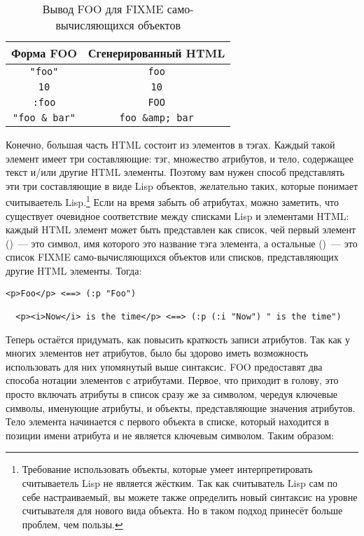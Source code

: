 \begin{table}[tb]
\begin{tabular}{|c|c|}
\hline
  Форма FOO & Сгенерированный HTML \\
\hline
  \lstinline!"foo"! &\lstinline!foo! \\
  \lstinline!10! & \lstinline!10! \\
  \lstinline!:foo! & \lstinline!FOO! \\
  \lstinline!"foo & bar"! & \lstinline!foo &amp; bar!\\
\hline
\end{tabular}
  \caption{Вывод FOO для FIXME само-вычисляющихся объектов} 
  \label{table:30-1}
\end{table}

Конечно, большая часть HTML состоит из элементов в тэгах. Каждый такой элемент имеет три
составляющие: тэг, множество атрибутов, и тело, содержащее текст и/или другие HTML
элементы. Поэтому вам нужен способ представлять эти три составляющие в виде Lisp объектов,
желательно таких, которые понимает считываетель Lisp.\footnote{Требование использовать
  объекты, которые умеет интерпретировать считываетель Lisp не является жёстким. Так как
  считыватель Lisp сам по себе настраиваемый, вы можете также определить новый синтаксис
  на уровне считывателя для нового вида объекта. Но в таком подход принесёт больше
  проблем, чем пользы.} Если на время забыть об атрибутах, можно заметить, что существует
очевидное соответствие между списками Lisp и элементами HTML: каждый HTML элемент может
быть представлен как список, чей первый элемент ()~--- это символ, имя которого
это название тэга элемента, а остальные ()~--- это список FIXME
само-вычисляющихся объектов или списков, представляющих другие HTML элементы. Тогда:

\begin{lstlisting}[style=lisprepl]
  <p>Foo</p> <==> (:p "Foo")

  <p><i>Now</i> is the time</p> <==> (:p (:i "Now") " is the time")
\end{lstlisting}

Теперь остаётся придумать, как повысить краткость записи атрибутов. Так как у многих
элементов нет атрибутов, было бы здорово иметь возможность использовать для них упомянутый
выше синтаксис. FOO предоставят два способа нотации элементов с атрибутами. Первое, что
приходит в голову, это просто включать атрибуты в список сразу же за символом, чередуя
ключевые символы, именующие атрибуты, и объекты, представляющие значения атрибутов. Тело
элемента начинается с первого объекта в списке, который находится в позиции имени атрибута
и не является ключевым символом. Таким образом:

